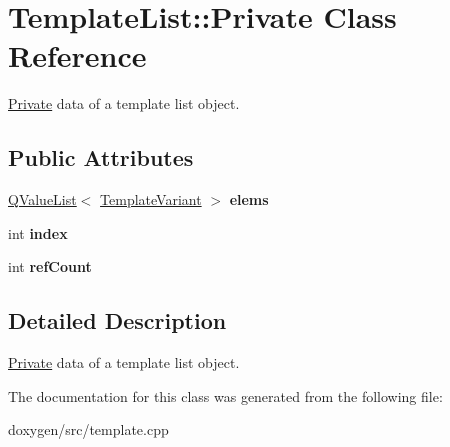 \hypertarget{class_template_list_1_1_private}{}\section{Template\+List\+::Private Class Reference}
\label{class_template_list_1_1_private}


\mbox{\hyperlink{class_template_list_1_1_private}{Private}} data of a template list object.  


\subsection*{Public Attributes}
\begin{DoxyCompactItemize}
\item 
\mbox{\label{class_template_list_1_1_private_acc04f917dcef1551fe158ced2e460634}} 
\mbox{\hyperlink{class_q_value_list}{Q\+Value\+List}}$<$ \mbox{\hyperlink{class_template_variant}{Template\+Variant}} $>$ {\bfseries elems}
\item 
\mbox{\label{class_template_list_1_1_private_ac9f06bb46854c943324ba962864bf8e4}} 
int {\bfseries index}
\item 
\mbox{\label{class_template_list_1_1_private_a749f4c55c79d45744976a305bd6958a9}} 
int {\bfseries ref\+Count}
\end{DoxyCompactItemize}


\subsection{Detailed Description}
\mbox{\hyperlink{class_template_list_1_1_private}{Private}} data of a template list object. 

The documentation for this class was generated from the following file\+:\begin{DoxyCompactItemize}
\item 
doxygen/src/template.\+cpp\end{DoxyCompactItemize}

